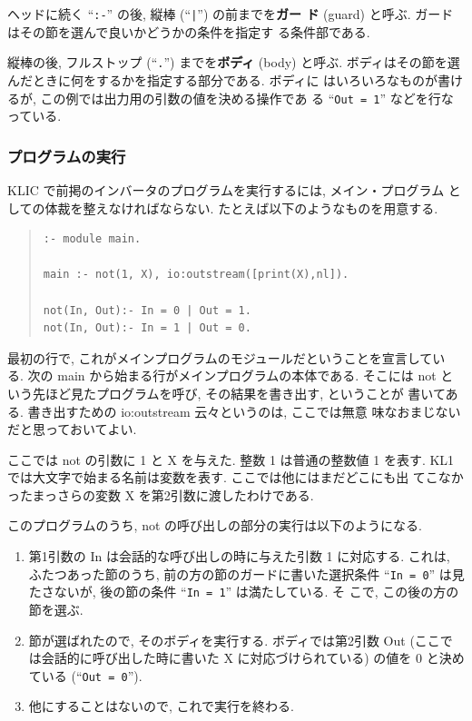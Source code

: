 \documentclass[a4,titlepage]{jsreport}
\def\em{\bf\dg}
\let\dg\bf
\newenvironment{program}{\begin{quote}}{\end{quote}}
\begin{document}
ヘッドに続く ``{\tt :-}'' の後, 縦棒 (``\verb^|^'') の前までを{\em ガー
ド} (guard) と呼ぶ.  ガードはその節を選んで良いかどうかの条件を指定す
る条件部である.

縦棒の後, フルストップ (``{\tt .}'') までを{\em ボディ} (body) と呼ぶ.
ボディはその節を選んだときに何をするかを指定する部分である.  ボディに
はいろいろなものが書けるが, この例では出力用の引数の値を決める操作であ
る ``{\tt Out = 1}'' などを行なっている.

\subsubsection{プログラムの実行}
KLIC で前掲のインバータのプログラムを実行するには, メイン・プログラム
としての体裁を整えなければならない.  たとえば以下のようなものを用意する.

\begin{program}
\begin{Verbatim}[baselinestretch=0.8]
:- module main.

main :- not(1, X), io:outstream([print(X),nl]).

not(In, Out):- In = 0 | Out = 1.
not(In, Out):- In = 1 | Out = 0.
\end{Verbatim}
\end{program}

最初の行で, これがメインプログラムのモジュールだということを宣言してい
る.  次の main から始まる行がメインプログラムの本体である.  そこには 
not という先ほど見たプログラムを呼び, その結果を書き出す, ということが
書いてある.  書き出すための io:outstream 云々というのは, ここでは無意
味なおまじないだと思っておいてよい.

ここでは not の引数に 1 と X を与えた.  整数 1 は普通の整数値 1 を表す.
KL1 では大文字で始まる名前は変数を表す.  ここでは他にはまだどこにも出
てこなかったまっさらの変数 X を第2引数に渡したわけである.

このプログラムのうち, not の呼び出しの部分の実行は以下のようになる.
\begin{enumerate}
\item
第1引数の In は会話的な呼び出しの時に与えた引数 1 に対応する.  これは, 
ふたつあった節のうち, 前の方の節のガードに書いた選択条件 ``{\tt In =
0}'' は見たさないが, 後の節の条件 ``{\tt In = 1}'' は満たしている.  そ
こで, この後の方の節を選ぶ.
\item
節が選ばれたので, そのボディを実行する.  ボディでは第2引数 Out (ここで
は会話的に呼び出した時に書いた X に対応づけられている) の値を 0 と決め
ている (``{\tt Out = 0}'').
\item
他にすることはないので, これで実行を終わる.
\end{enumerate}
\end{document}
